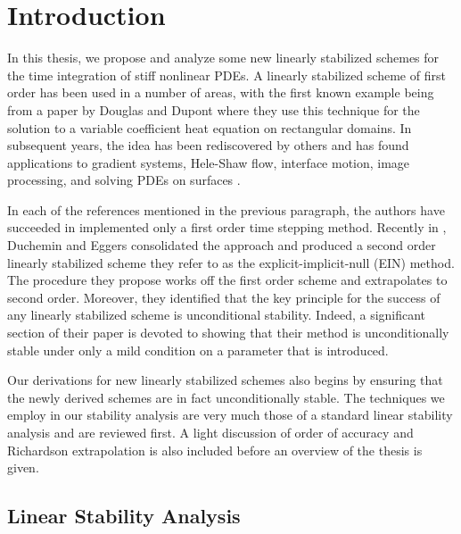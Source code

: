 \chapter{Introduction}
In this thesis, we propose and analyze some new linearly stabilized schemes for the time integration of stiff nonlinear PDEs. A linearly stabilized scheme of first order has been used in a number of areas, with the first known example being from a paper by Douglas and Dupont \cite{douglas1971alternating} where they use this technique for the solution to a variable coefficient heat equation on rectangular domains. In subsequent years, the idea has been rediscovered by others \cite{eyre1998unconditionally,smereka2003semi} and has found applications to gradient systems, Hele-Shaw flow, interface motion, image processing, and solving PDEs on surfaces \cite{eyre1998bunconditionally,salac2008local,glasner2002diffuse,schonlieb2011unconditionally,macdonald2009implicit}.

In each of the references mentioned in the previous paragraph, the authors have succeeded in implemented only a first order time stepping method. Recently in \cite{duchemin2014explicit},  Duchemin and Eggers consolidated the approach and produced a second order linearly stabilized scheme they refer to as the explicit-implicit-null (EIN) method. The procedure they propose works off the first order scheme and extrapolates to second order. Moreover, they identified that the key principle for the success of any linearly stabilized scheme is unconditional stability. Indeed, a significant section of their paper is devoted to showing that their method is unconditionally stable under only a mild condition on a parameter that is introduced.

Our derivations for new linearly stabilized schemes also begins by ensuring that the newly derived schemes are in fact unconditionally stable. The techniques we employ in our stability analysis are very much those of a standard linear stability analysis and are reviewed first. A light discussion of order of accuracy and Richardson extrapolation is also included before an overview of the thesis is given.

\section{Linear Stability Analysis}
